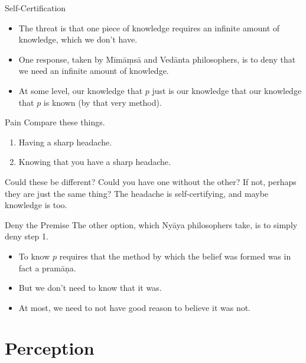 \documentclass[
  17pt,
  letterpaper,
  ignorenonframetext,
  aspectratio=169,
  handout]{beamer}
\providecommand{\tightlist}{%
  \setlength{\itemsep}{0pt}\setlength{\parskip}{0pt}}\usepackage{longtable,booktabs,array}
\begin{document}
\begin{frame}{Self-Certification}
\protect\hypertarget{self-certification}{}
\begin{itemize}[<+->]
\tightlist
\item
  The threat is that one piece of knowledge requires an infinite amount
  of knowledge, which we don't have.
\item
  One response, taken by Mīmāṃsā and Vedānta philosophers, is to deny
  that we need an infinite amount of knowledge.
\item
  At some level, our knowledge that \(p\) just is our knowledge that our
  knowledge that \(p\) is known (by that very method).
\end{itemize}
\end{frame}

\begin{frame}{Pain}
\protect\hypertarget{pain}{}
Compare these things.

\begin{enumerate}[<+->]
\tightlist
\item
  Having a sharp headache.
\item
  Knowing that you have a sharp headache.
\end{enumerate}

\pause Could these be different? Could you have one without the other?
If not, perhaps they are just the same thing? The headache is
self-certifying, and maybe knowledge is too.
\end{frame}

\begin{frame}{Deny the Premise}
\protect\hypertarget{deny-the-premise}{}
The other option, which Nyāya philosophers take, is to simply deny step
1.

\begin{itemize}[<+->]
\tightlist
\item
  To know \(p\) requires that the method by which the belief was formed
  was in fact a pramāṇa.
\item
  But we don't need to know that it was.
\item
  At most, we need to not have good reason to believe it was not.
\end{itemize}
\end{frame}

\hypertarget{perception}{%
\section{Perception}\label{perception}}
\end{document}
